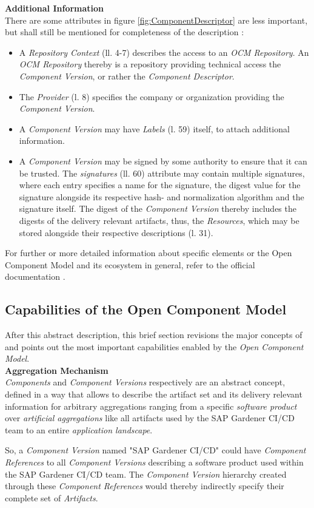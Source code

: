 \noindent\textbf{Additional Information}\\
There are some attributes in figure \ref{fig:ComponentDescriptor} are less important, but shall still be mentioned for completeness of the description \cite{OCMSpec}:
\begin{itemize}
\item A \emph{Repository Context} (ll. 4-7) describes the access to an \emph{OCM Repository}. An \emph{OCM Repository} thereby is a repository providing technical access the \emph{Component Version}, or rather the \emph{Component Descriptor}. 
\item The \emph{Provider} (l. 8) specifies the company or organization providing the \emph{Component Version}.
\item A \emph{Component Version} may have \emph{Labels} (l. 59) itself, to attach additional information. 
\item A \emph{Component Version} may be signed by some authority to ensure that it can be trusted. The \emph{signatures} (ll. 60) attribute may contain multiple signatures, where each entry specifies a name for the signature, the digest value for the signature alongside its respective hash- and normalization algorithm and the signature itself. The digest of the \emph{Component Version} thereby includes the digests of the delivery relevant artifacts, thus, the \emph{Resources}, which may be stored alongside their respective descriptions (l. 31).
\end{itemize}

For further or more detailed information about specific elements or the Open Component Model and its ecosystem in general, refer to the official documentation \cite{OCMSpec}.

\subsection{Capabilities of the Open Component Model}
After this abstract description, this brief section revisions the major concepts of and points out the most important capabilities enabled by the \emph{Open Component Model}.\\

\noindent\textbf{Aggregation Mechanism}\\
\emph{Components} and \emph{Component Versions} respectively are an abstract concept, defined in a way that allows to describe the artifact set and its delivery relevant information for arbitrary aggregations ranging from a specific \emph{software product} over \emph{artificial aggregations} like all artifacts used by the SAP Gardener CI/CD team to an entire \emph{application landscape}.\par
So, a \emph{Component Version} named "SAP Gardener CI/CD" could have \emph{Component References} to all \emph{Component Versions} describing a software product used within the SAP Gardener CI/CD team. The \emph{Component Version} hierarchy created through these \emph{Component References} would thereby indirectly specify their complete set of \emph{Artifacts}.\\

